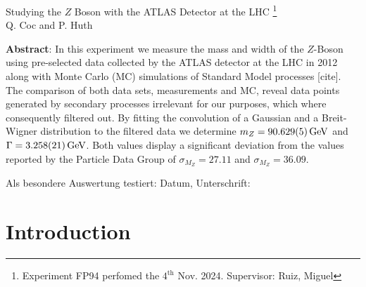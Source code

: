 \documentclass[11 pt]{article}
\begin{document}
\thispagestyle{empty}     %
\null\vspace{40mm}
\begin{center}
{%
\Large  
Studying the $Z$ Boson with the ATLAS Detector at the LHC \footnote{\noindent Experiment FP94 perfomed the $4^{\textrm{th}}$ Nov. 2024. Supervisor:	Ruiz, Miguel}
}\\[15mm]
Q. Coc and P. Huth

\vspace{25mm}

\parbox{0.9\textwidth}{
\textbf{Abstract}:    
\small 
In this experiment we measure the mass and width of the $Z$-Boson using pre-selected data collected by the ATLAS detector at the LHC in 2012 along with Monte Carlo (MC) simulations of Standard Model processes [cite]. The comparison of both data sets, measurements and MC, reveal data points generated by secondary processes irrelevant for our purposes, which where consequently filtered out. By fitting the convolution of a Gaussian and a Breit-Wigner distribution to the filtered data we determine $m_{Z} = \SI{90.629\pm 0.005}{\giga\electronvolt}$ and $\Gamma = \SI{3.258\pm 0.021}{\giga\electronvolt}$. Both values display a significant deviation from the values reported by the Particle Data Group \footnotemark of $\sigma_{M_Z} = 27.11$ and $\sigma_{M_Z} = 36.09$.
}
\end{center}
\vfill
Als besondere Auswertung testiert: Datum, Unterschrift:
\vspace{20mm}

\newpage  
\null\thispagestyle{empty} 

\newpage
{}

\section{Introduction}
%
\end{document}
